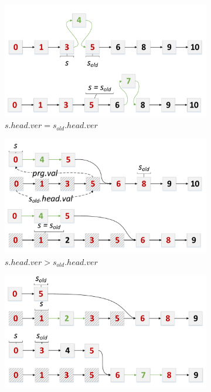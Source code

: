 \documentclass[10pt,journal,letter,compsoc]{IEEEtran}
\begin{document}
\begin{figure}[t]
    \begin{subfigure}{0.33\textwidth}
        \centering
        \includegraphics[width=1\columnwidth]{./graph/mdlist-3d-rewind1.pdf}
        \caption{$s.head.ver = s_{old}.head.ver$}
        \label{fig:rewind1}
    \end{subfigure}
    \hfill
    \begin{subfigure}{0.33\textwidth}
        \centering
        \includegraphics[width=1\columnwidth]{./graph/mdlist-3d-rewind2.pdf}
        \caption{$s.head.ver > s_{old}.head.ver$}
        \label{fig:rewind2}
    \end{subfigure}
    \hfill
    \begin{subfigure}{0.33\textwidth}
        \centering
        \includegraphics[width=1\columnwidth]{./graph/mdlist-3d-rewind3.pdf}

\end{subfigure}
\end{figure}
\end{document}
